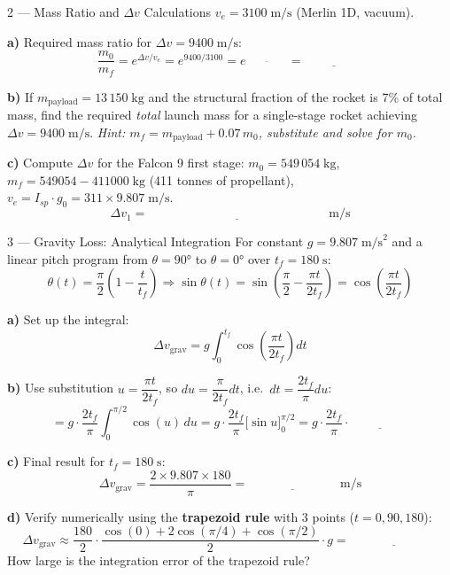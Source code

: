 \documentclass[12pt, a4paper]{article}
\begin{document}
\begin{exercisebox}{2 — Mass Ratio and $\Delta v$ Calculations}
$v_e = 3100\;\text{m/s}$ (Merlin 1D, vacuum).

\textbf{a)} Required mass ratio for $\Delta v = 9400\;\text{m/s}$:
\[
  \frac{m_0}{m_f} = e^{\Delta v / v_e} = e^{9400/3100} = e^{\underline{\hspace{2cm}}} = \underline{\hspace{2cm}}
\]

\textbf{b)} If $m_\text{payload} = 13\,150\;\text{kg}$ and the structural fraction of the rocket is 7\% of total mass,
find the required \textit{total} launch mass for a single-stage rocket achieving $\Delta v = 9400\;\text{m/s}$.
\textit{Hint: $m_f = m_\text{payload} + 0.07\,m_0$, substitute and solve for $m_0$.}

\textbf{c)} Compute $\Delta v$ for the Falcon 9 first stage:
$m_0 = 549\,054\;\text{kg}$, $m_f = 549054 - 411000\;\text{kg}$ (411 tonnes of propellant),
$v_e = I_{sp}\cdot g_0 = 311 \times 9.807\;\text{m/s}$.
\[
  \Delta v_1 = \underline{\hspace{6cm}}\;\text{m/s}
\]
\end{exercisebox}

\begin{solutionspace}[8cm]
\end{solutionspace}

\begin{exercisebox}{3 — Gravity Loss: Analytical Integration}
For constant $g=9.807\;\text{m/s}^2$ and a linear pitch program from $\theta=90°$ to $\theta=0°$ over $t_f = 180\;\text{s}$:
\[
  \theta(t) = \frac{\pi}{2}\left(1 - \frac{t}{t_f}\right) \Rightarrow \sin\theta(t) = \sin\!\left(\frac{\pi}{2} - \frac{\pi t}{2t_f}\right) = \cos\!\left(\frac{\pi t}{2t_f}\right)
\]

\textbf{a)} Set up the integral:
\[
  \Delta v_\text{grav} = g\int_0^{t_f}\cos\!\left(\frac{\pi t}{2t_f}\right)dt
\]

\textbf{b)} Use substitution $u = \dfrac{\pi t}{2t_f}$, so $du = \dfrac{\pi}{2t_f}dt$, i.e.\ $dt = \dfrac{2t_f}{\pi}du$:
\[
  = g\cdot\frac{2t_f}{\pi}\int_0^{\pi/2}\cos(u)\,du
  = g\cdot\frac{2t_f}{\pi}\Big[\sin u\Big]_0^{\pi/2}
  = g\cdot\frac{2t_f}{\pi}\cdot\underline{\hspace{2cm}}
\]

\textbf{c)} Final result for $t_f = 180\;\text{s}$:
\[
  \Delta v_\text{grav} = \frac{2 \times 9.807 \times 180}{\pi} = \underline{\hspace{3cm}}\;\text{m/s}
\]

\textbf{d)} Verify numerically using the \textbf{trapezoid rule} with 3 points ($t=0, 90, 180$):
\[
  \Delta v_\text{grav} \approx \frac{180}{2}\cdot\frac{\cos(0) + 2\cos(\pi/4) + \cos(\pi/2)}{2} \cdot g = \underline{\hspace{3cm}}
\]
How large is the integration error of the trapezoid rule?
\end{exercisebox}
\end{document}
